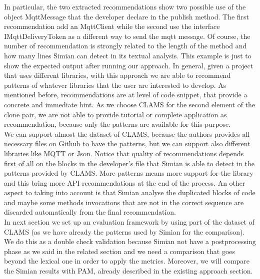 
In particular, the two extracted recommendations show two possible use of the object MqttMessage that the developer declare in the publish method. The first recommendation add an MqttClient while the second use the interface IMqttDeliveryToken as a different way to send the mqtt message. Of course, the number of recommendation is strongly related to the length of the method and how many lines Simian can detect in its textual analysis. This example is just to show the expected output after running our approach. In general, given a project that uses different libraries, with this approach we are able to recommend patterns of whatever libraries that the user are interested to develop. As mentioned before, recommendations are at level of code snippet, that provide a concrete and immediate hint. As we choose CLAMS for the second element of the clone pair, we are not able to provide tutorial or complete application as recommendation, because only the patterns are available for this purpose. \\
We can support almost the dataset of CLAMS, because the authors provides all necessary files on Github to have the patterns, but we can support also different libraries like MQTT or Json. Notice that quality of recommendations depends first of all on the blocks in the developer's file that Simian is able to detect in the patterns provided by CLAMS. More patterns means more support for the library and this bring more API recommendations at the end of the process. An other aspect to taking into account is that Simian analyse the duplicated blocks of code and maybe some methods invocations that are not in the correct sequence are discarded automatically from the final recommendation. \\
In next section we set up an evaluation framework  by using part of the dataset of CLAMS (as we have already the patterns used by Simian for the comparison). We do this as a double check validation because Simian not have a postprocessing phase as we said in the related section and we need a comparison that goes beyond the lexical one in order to apply the metrics. Moreover, we will compare the Simian results with PAM, already described in the existing approach section.




